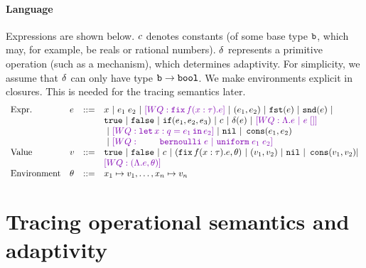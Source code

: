\documentclass[a4paper,11pt]{article}
\newcommand{\wq}[1]{\textcolor[rgb]{.50,0.0,0.7}{[WQ: #1]}}
\theoremstyle{definition}
\begin{document}
\paragraph{Language}
Expressions are shown below. $c$ denotes constants (of some base
type $\mathtt{b}$, which may, for example, be reals or rational
numbers). $\delta$ represents a primitive operation (such as a
mechanism), which determines adaptivity. For simplicity, we assume
that $\delta$ can only have type $\mathtt{b} \to \mathtt{bool}$. We make
environments explicit in closures. This is needed for the tracing
semantics later.
\[\begin{array}{llll}
\mbox{Expr.} & \expr & ::= & x ~|~ \expr_1 \eapp \expr_2 ~|~ \wq{\efix f(x:\type).\expr}
 ~|~ (\expr_1, \expr_2) ~|~ \eprojl(\expr) ~|~ \eprojr(\expr) ~| \\
%
& & & \etrue ~|~ \efalse ~|~ \eif(\expr_1, \expr_2, \expr_3) ~|~
\econst ~|~ \eop(\expr)  ~|~ \wq {\eilam \expr ~|~ \expr \eapp [] } \\
& & & ~|~ \wq {\elet  x:q = \expr_1 \ein \expr_2 } ~|~ \enil ~|~  \econs (
      \expr_1, \expr_2) \\
& & & ~|~ \wq{ ~~~~~~~
 \bernoulli \eapp \expr ~|~ \uniform \eapp \expr_1 \eapp
      \expr_2 } \\
%
\mbox{Value} & \valr & ::= & \etrue ~|~ \efalse ~|~ \econst ~|~
(\efix f(x:\type).\expr, \env) ~|~ (\valr_1, \valr_2) 
    ~|~ \enil ~|~ \econs (\valr_1, \valr_2) | \\
& & & \wq {(\eilam \expr , \env) } \\ 
%
\mbox{Environment} & \env & ::= & x_1 \mapsto \valr_1, \ldots, x_n \mapsto \valr_n
\end{array}\]





\section{Tracing operational semantics and adaptivity}
\end{document}
